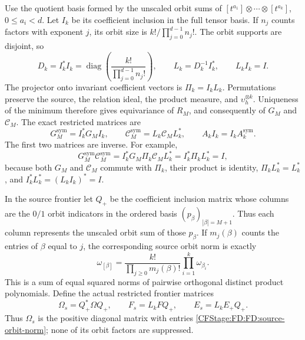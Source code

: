 Use the quotient basis formed by the unscaled orbit sums of
\([t^{a_1}]\otimes\cdots\otimes[t^{a_k}]\), \(0\le a_i<d\).
Let \(I_k\) be its coefficient inclusion in the full tensor basis.
If \(n_j\) counts factors with exponent \(j\), its orbit size is
\(k!/\prod_{j=0}^{d-1}n_j!\).  The orbit supports are disjoint, so
\begin{equation}
D_k=I_k^*I_k
=\operatorname{diag}\left(\frac{k!}{\prod_{j=0}^{d-1}n_j!}\right),
\qquad L_k=D_k^{-1}I_k^*,\qquad L_kI_k=I.
\tag{FD.22}\label{CFStage:FD:FD:orbit-coordinates}
\end{equation}
The projector onto invariant coefficient vectors is \(\Pi_k=I_kL_k\).
Permutations preserve the source, the relation ideal, the product
measure, and \(\upsilon_h^{\otimes k}\).  Uniqueness of the minimum
therefore gives equivariance of \(R_M\), and consequently of \(G_M\)
and \(\mathcal C_M\).  The exact restricted matrices are
\begin{equation}
G_M^{\mathrm{sym}}=I_k^*G_MI_k,\qquad
\mathcal C_M^{\mathrm{sym}}=L_k\mathcal C_ML_k^*,\qquad
A_kI_k=I_kA_k^{\mathrm{sym}}.
\tag{FD.23}\label{CFStage:FD:FD:symmetric-matrices}
\end{equation}
The first two matrices are inverse.  For example,
\[
G_M^{\mathrm{sym}}\mathcal C_M^{\mathrm{sym}}
=I_k^*G_M\Pi_k\mathcal C_ML_k^*
=I_k^*\Pi_kL_k^*=I,
\]
because both \(G_M\) and \(\mathcal C_M\) commute with \(\Pi_k\),
their product is identity, \(\Pi_kL_k^*=L_k^*\), and
\(I_k^*L_k^*=(L_kI_k)^*=I\).

In the source frontier let \(Q_+\) be the coefficient inclusion matrix
whose columns are the \(0/1\) orbit indicators in the ordered basis
\((p_\beta)_{|\beta|=M+1}\).  Thus each column represents the
unscaled orbit sum of those \(p_\beta\).  If \(m_j(\beta)\)
counts the entries of \(\beta\) equal to \(j\), the corresponding
source orbit norm is exactly
\begin{equation}
\omega_{[\beta]}=
\frac{k!}{\prod_{j\ge0}m_j(\beta)!}\prod_{i=1}^k\omega_{\beta_i}.
\tag{FD.24}\label{CFStage:FD:FD:source-orbit-norm}
\end{equation}
This is a sum of equal squared norms of pairwise orthogonal distinct
product polynomials.  Define the actual restricted frontier matrices
\begin{equation}
\Omega_s=Q_+^*\Omega Q_+,\qquad
F_s=L_kFQ_+,\qquad E_s=L_kE_+Q_+.
\tag{FD.25}\label{CFStage:FD:FD:symmetric-frontier}
\end{equation}
Thus \(\Omega_s\) is the positive diagonal matrix with entries
\eqref{CFStage:FD:FD:source-orbit-norm}; none of its orbit factors are suppressed.


